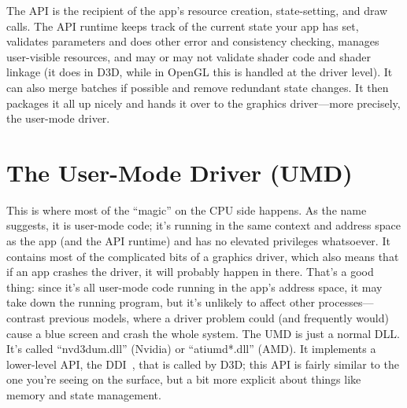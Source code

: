 The API is the recipient of the app's resource creation, state-setting, and draw
calls. The API runtime keeps track of the current state your app has set,
validates parameters and does other error and consistency checking, manages
user-visible resources, and may or may not validate shader code and shader
linkage (it does in D3D, while in OpenGL this is handled at the driver level).
It can also merge batches if possible and remove redundant state changes. It 
then packages it all up nicely and hands it over to the graphics driver---more 
precisely, the user-mode driver.

\section{The User-Mode Driver (UMD)}

This is where most of the ``magic'' on the CPU side happens. As the name 
suggests, it is user-mode code; it's running in the same context and address 
space as the app (and the API runtime) and has no elevated privileges 
whatsoever. It contains most of the complicated bits of a graphics driver, 
which also means that if an app crashes the driver, it will probably happen in 
there.  That's a good thing: since it's all user-mode code running in the app's 
address space, it may take down the running program, but it's unlikely to 
affect other processes---contrast previous models, where a driver problem could 
(and frequently would) cause a blue screen and crash the whole system.
The UMD is just a normal DLL. It's called ``nvd3dum.dll'' (Nvidia) or 
``atiumd*.dll'' (AMD).  It implements a lower-level API, the 
DDI~\citep{umd-ddi}, that is called by D3D; this API is fairly similar to the 
one you're seeing on the surface, but a bit
more explicit about things like memory and state management.

